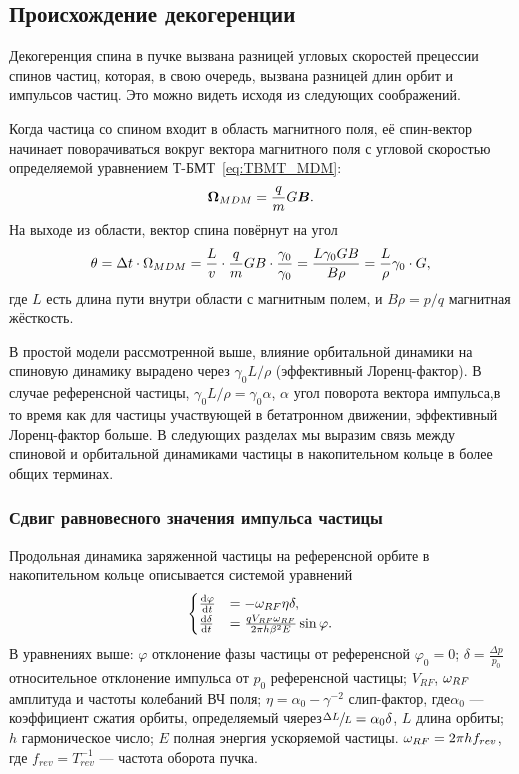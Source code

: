 \documentclass{report}
\begin{document}
\subsection{Происхождение декогеренции}
Декогеренция спина в пучке вызвана разницей угловых скоростей
прецессии спинов частиц, которая, в свою очередь, вызвана разницей
длин орбит и импульсов частиц. Это можно видеть исходя из следующих
соображений.

Когда частица со спином входит в область магнитного поля, её спин-вектор
начинает поворачиваться вокруг вектора магнитного поля с угловой
скоростью определяемой уравнением Т-БМТ~\eqref{eq:TBMT_MDM}:
\begin{equation*}
  \boldsymbol{\Omega}_{MDM} = \frac qm G\boldsymbol B.
\end{equation*}
На выходе из области, вектор спина повёрнут на угол
\begin{equation*}
  \theta = \Delta t\cdot\Omega_{MDM} = \frac Lv \cdot \frac qm GB\cdot \frac{\gamma_0}{\gamma_0} = \frac{L\gamma_0 GB}{B\rho} = \frac L\rho\gamma_0\cdot G,
\end{equation*}
где $L$ есть длина пути внутри области с магнитным полем, и $B\rho =
p/q$ магнитная жёсткость.

В простой модели рассмотренной выше, влияние орбитальной динамики на
спиновую динамику вырадено через $\gamma_0 L/\rho$ (эффективный
Лоренц-фактор). В случае референсной частицы, $\gamma_0L/\rho =
\gamma_0\alpha$, $\alpha$ угол поворота вектора импульса,в то время
как для частицы участвующей в бетатронном движении, эффективный
Лоренц-фактор больше. В следующих разделах мы выразим связь между
спиновой и орбитальной динамиками частицы в накопительном кольце в
более общих терминах.

\subsubsection{Сдвиг равновесного значения импульса частицы}
Продольная динамика заряженной частицы на референсной орбите в
накопительном кольце описывается системой уравнений
\begin{equation*}
  \begin{cases}
    \frac{\mathrm{d} {\varphi}}{\mathrm{d} t} &= -\omega_{RF}\eta\delta, \\
    \frac{\mathrm{d} {\delta}}{\mathrm{d} t} &= \frac{q V_{RF}\omega_{RF}}{2\pi h\beta^2E}\sin\varphi.
  \end{cases}
\end{equation*}
В уравнениях выше: $\varphi$ отклонение фазы частицы от референсной
$\varphi_0 = 0$; $\delta = \frac{\Delta p}{p_0}$ относительное
отклонение импульса от $p_0$ референсной частицы; $V_{RF}$, $\omega_{RF}$
амплитуда и частоты колебаний ВЧ поля; $\eta = \alpha_0 - \gamma^{-2}$
слип-фактор, где$\alpha_0$ --- коэффициент сжатия орбиты, определяемый
чяерез$\sfrac{\Delta L}{L} = \alpha_0\delta$, $L$ длина орбиты; $h$
гармоническое число; $E$ полная энергия ускоряемой частицы. $\omega_{RF} =
2\pi h f_{rev}$, где $f_{rev}=T_{rev}^{-1}$ --- частота оборота пучка.
\end{document}
